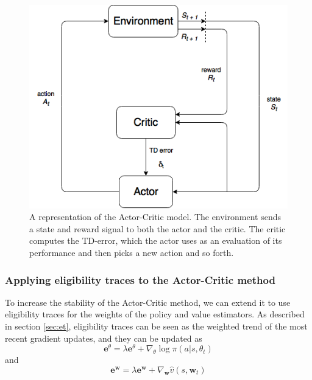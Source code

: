 \documentclass[11pt]{article}
\begin{document}
\begin{figure}[!h]
    \centering
    \includegraphics[scale = 0.5]{include/ActorCriticDiagram.png}
    \caption{A representation of the Actor-Critic model.
        The environment sends a state and reward signal to both the actor and the critic.
        The critic computes the TD-error, which the actor uses as an evaluation of its performance
        and then picks a new action and so forth.}
    \label{fig:actor-critic}
\end{figure}


\subsubsection{Applying eligibility traces to the Actor-Critic method}

To increase the stability of the Actor-Critic method, we can extend it to use eligibility traces
for the weights of the policy and value estimators.
As described in section \ref{sec:et}, eligibility traces can be seen as the weighted trend
of the most recent gradient updates, and they can be updated as
\begin{equation}
    \mathbf{e}^{\theta} = \lambda \mathbf{e}^{\theta} + \nabla_\theta \log\pi(a|s,\theta_t)
\end{equation}
and
\begin{equation}
    \mathbf{e}^{\mathbf{w}} = \lambda \mathbf{e}^{\mathbf{w}} + \nabla_\mathbf{w} \hat{v}(s, \mathbf{w}_t)
\end{equation}
\end{document}
